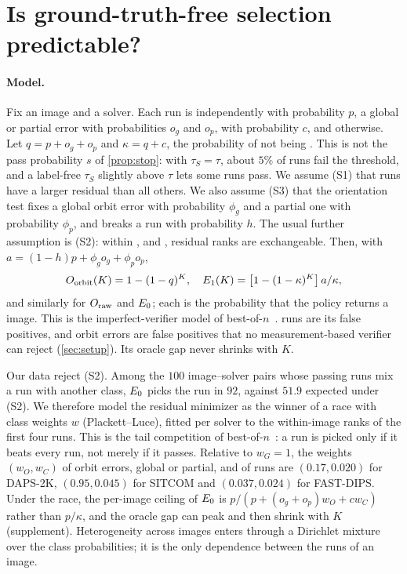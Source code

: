 \section{Is ground-truth-free selection predictable?}
\label{sec:selection}

\paragraph{Model.}
Fix an image and a solver.
Each run is independently \good with probability $p$, a global or partial \orbit error with probabilities $o_g$ and $o_p$, \cons with probability $c$, and \incons otherwise.
Let $q=p+o_g+o_p$ and $\kappa=q+c$, the probability of not being \incons.
This is not the pass probability $s$ of \cref{prop:stop}: with $\tau_S=\tau$, about $5\%$ of \good runs fail the threshold, and a label-free $\tau_S$ slightly above $\tau$ lets some \incons runs pass.
We assume (S1) that \incons runs have a larger residual than all others.
We also assume (S3) that the orientation test fixes a global orbit error with probability $\phi_g$ and a partial one with probability $\phi_p$, and breaks a \good run with probability $h$.
The usual further assumption is (S2): within \good, \orbit and \cons, residual ranks are exchangeable.
Then, with $a=(1-h)p+\phi_go_g+\phi_po_p$,
\begin{equation}
O_{\mathrm{orbit}}(K)=1-(1-q)^K,\quad E_1(K)=\bigl[1-(1-\kappa)^K\bigr]\,a/\kappa,
\label{eq:curves}
\end{equation}
and similarly for $O_{\mathrm{raw}}$ and $E_0$; each is the probability that the policy returns a \good image.
This is the imperfect-verifier model of best-of-$n$~\cite{stroebl2026limits}.
\cons runs are its false positives, and orbit errors are false positives that no measurement-based verifier can reject (\cref{sec:setup}).
Its oracle gap never shrinks with $K$.

Our data reject (S2).
Among the $100$ image--solver pairs whose passing runs mix a \good run with another class, $E_0$ picks the \good run in $92$, against $51.9$ expected under (S2).
We therefore model the residual minimizer as the winner of a race with class weights $w$ (Plackett--Luce), fitted per solver to the within-image ranks of the first four runs.
This is the tail competition of best-of-$n$~\cite{yano2026tail}: a \cons run is picked only if it beats every \good run, not merely if it passes.
Relative to $w_G=1$, the weights $(w_O,w_C)$ of orbit errors, global or partial, and of \cons runs are $(0.17,0.020)$ for DAPS-2K, $(0.95,0.045)$ for SITCOM and $(0.037,0.024)$ for FAST-DIPS.
Under the race, the per-image ceiling of $E_0$ is $p/(p+(o_g+o_p)w_O+cw_C)$ rather than $p/\kappa$, and the oracle gap can peak and then shrink with $K$ (supplement).
Heterogeneity across images enters through a Dirichlet mixture over the class probabilities; it is the only dependence between the runs of an image.

